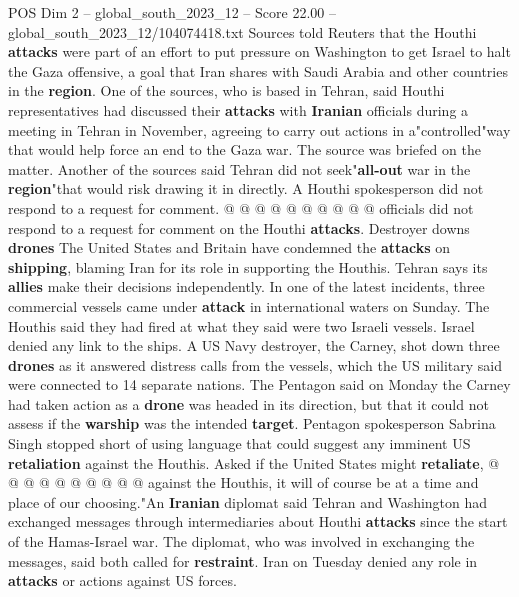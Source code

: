 \begin{textsample}{POS Dim 2 – global\_south\_2023\_12 – Score 22.00 – global\_south\_2023\_12/104074418.txt}
Sources told Reuters that the Houthi \textbf{attacks} were part of an effort to put pressure on Washington to get Israel to halt the Gaza offensive, a goal that Iran shares with Saudi Arabia and other countries in the \textbf{region}.
One of the sources, who is based in Tehran, said Houthi representatives had discussed their \textbf{attacks} with \textbf{Iranian} officials during a meeting in Tehran in November, agreeing to carry out actions in a"controlled"way that would help force an end to the Gaza war.
The source was briefed on the matter.
Another of the sources said Tehran did not seek"\textbf{all-out} war in the \textbf{region}"that would risk drawing it in directly.
A Houthi spokesperson did not respond to a request for comment. @ @ @ @ @ @ @ @ @ @ officials did not respond to a request for comment on the Houthi \textbf{attacks}.
Destroyer downs \textbf{drones} The United States and Britain have condemned the \textbf{attacks} on \textbf{shipping}, blaming Iran for its role in supporting the Houthis.
Tehran says its \textbf{allies} make their decisions independently.
In one of the latest incidents, three commercial vessels came under \textbf{attack} in international waters on Sunday.
The Houthis said they had fired at what they said were two Israeli vessels.
Israel denied any link to the ships.
A US Navy destroyer, the Carney, shot down three \textbf{drones} as it answered distress calls from the vessels, which the US military said were connected to 14 separate nations.
The Pentagon said on Monday the Carney had taken action as a \textbf{drone} was headed in its direction, but that it could not assess if the \textbf{warship} was the intended \textbf{target}.
Pentagon spokesperson Sabrina Singh stopped short of using language that could suggest any imminent US \textbf{retaliation} against the Houthis.
Asked if the United States might \textbf{retaliate}, @ @ @ @ @ @ @ @ @ @ against the Houthis, it will of course be at a time and place of our choosing."An \textbf{Iranian} diplomat said Tehran and Washington had exchanged messages through intermediaries about Houthi \textbf{attacks} since the start of the Hamas-Israel war.
The diplomat, who was involved in exchanging the messages, said both called for \textbf{restraint}.
Iran on Tuesday denied any role in \textbf{attacks} or actions against US forces.

\end{textsample}
